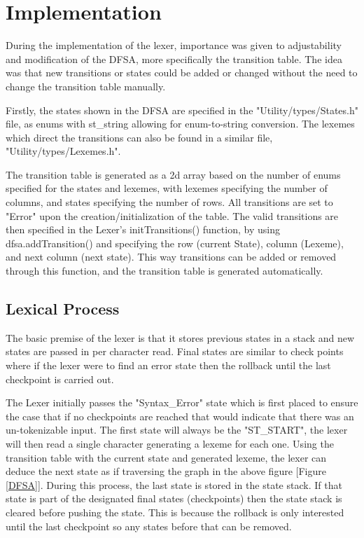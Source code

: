 \documentclass[12pt, a4paper]{report}
\begin{document}
\section{Implementation}
During the implementation of the lexer, importance was given to adjustability and modification of the DFSA, more specifically the transition table. The idea was that new transitions or states could be added or changed without the need to change the transition table manually.

Firstly, the states shown in the DFSA are specified in the "Utility/types/States.h" file, as enums with st\_string allowing for enum-to-string conversion. The lexemes which direct the transitions can also be found in a similar file, "Utility/types/Lexemes.h".

The transition table is generated as a 2d array based on the number of enums specified for the states and lexemes, with lexemes specifying the number of columns, and states specifying the number of rows. All transitions are set to "Error" upon the creation/initialization of the table. The valid transitions are then specified in the Lexer's initTransitions() function, by using dfsa.addTransition() and specifying the row (current State), column (Lexeme), and next column (next state). This way transitions can be added or removed through this function, and the transition table is generated automatically.

\subsection{Lexical Process}
The basic premise of the lexer is that it stores previous states in a stack and new states are passed in per character read. Final states are similar to check points where if the lexer were to find an error state then the rollback until the last checkpoint is carried out.

The Lexer initially passes the "Syntax\_Error" state which is first placed to ensure the case that if no checkpoints are reached that would indicate that there was an un-tokenizable input. The first state will always be the "ST\_START", the lexer will then read a single character generating a lexeme for each one. Using the transition table with the current state and generated lexeme, the lexer can deduce the next state as if traversing the graph in the above figure [Figure \ref{DFSA}]. During this process, the last state is stored in the state stack. If that state is part of the designated final states (checkpoints) then the state stack is cleared before pushing the state. This is because the rollback is only interested until the last checkpoint so any states before that can be removed.
\end{document}
